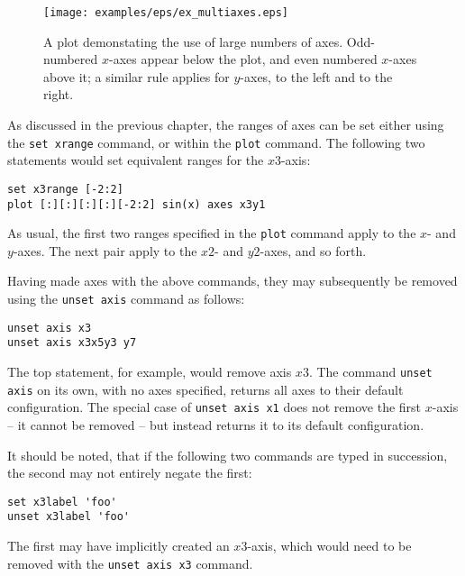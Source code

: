 \documentclass[a4paper,onecolumn,11pt]{book}
\begin{document}
\begin{figure}
\begin{center}
\texttt{[image: examples/eps/ex\_multiaxes.eps]}
\end{center}
\caption{A plot demonstating the use of large numbers of axes. Odd-numbered
$x$-axes appear below the plot, and even numbered $x$-axes above it; a similar
rule applies for $y$-axes, to the left and to the right.}
\label{fig:ex_multiaxes}
\end{figure}

As discussed in the previous chapter, the ranges of axes can be set either
using the \texttt{set xrange} command, or within the \texttt{plot} command. The following two
statements would set equivalent ranges for the $x3$-axis:

\begin{verbatim}
set x3range [-2:2]
plot [:][:][:][:][-2:2] sin(x) axes x3y1
\end{verbatim}

\noindent As usual, the first two ranges specified in the \texttt{plot} command
apply to the $x$- and $y$-axes. The next pair apply to the $x2$- and $y2$-axes,
and so forth.

\label{axis_removal} Having made axes with the above commands, they may
subsequently be removed using the \texttt{unset axis} command as follows:

\begin{verbatim}
unset axis x3
unset axis x3x5y3 y7
\end{verbatim}

\noindent The top statement, for example, would remove axis $x3$. The command
\texttt{unset axis} on its own, with no axes specified, returns all axes to
their default configuration.  The special case of \texttt{unset axis x1} does
not remove the first $x$-axis -- it cannot be removed -- but instead returns it
to its default configuration.

It should be noted, that if the following two commands are typed in succession,
the second may not entirely negate the first:

\begin{verbatim}
set x3label 'foo'
unset x3label 'foo'
\end{verbatim}

\noindent The first may have implicitly created an $x3$-axis, which would need
to be removed with the \texttt{unset axis x3} command.
\end{document}

